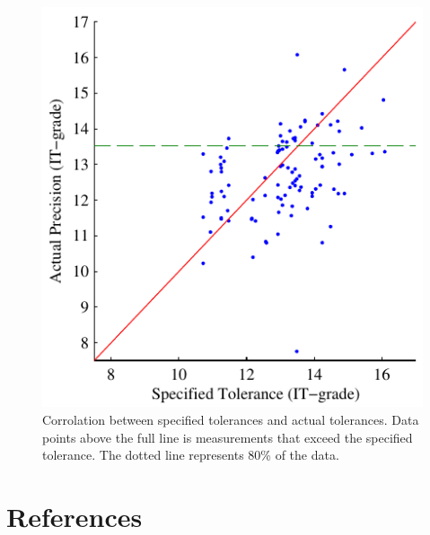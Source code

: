 \documentclass[aip,amsmath, reprint, author-year]{revtex4-1}
\begin{document}
\begin{figure}
\includegraphics{ITG_ITGSpec.pdf}
\caption{\label{fig:ITG_ITGSpec} Corrolation between specified tolerances and actual tolerances. 
Data points above the full line is measurements that exceed the specified tolerance. 
The dotted line represents 80\% of the data.}
\end{figure}




\section*{References}

\end{document}
